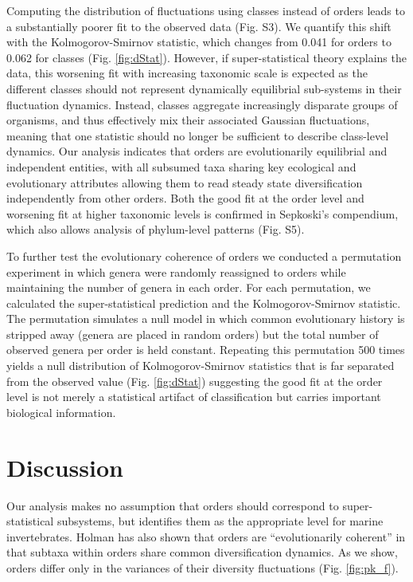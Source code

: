 \documentclass[12pt]{article}
\let\citep=\cite
\begin{document}
Computing the distribution of fluctuations using classes instead of
orders leads to a substantially poorer fit to the observed data
(Fig. S3). We quantify this shift with the
Kolmogorov-Smirnov statistic, which changes from 0.041 for orders to
0.062 for classes (Fig. \ref{fig:dStat}). However, if
super-statistical theory explains the data, this worsening fit with
increasing taxonomic scale is expected as the different classes should
not represent dynamically equilibrial sub-systems in their fluctuation
dynamics. Instead, classes aggregate increasingly disparate groups of
organisms, and thus effectively mix their associated Gaussian
fluctuations, meaning that one statistic should no longer be
sufficient to describe class-level dynamics. Our analysis indicates
that orders are evolutionarily equilibrial and independent entities,
with all subsumed taxa sharing key ecological and evolutionary
attributes allowing them to read steady state diversification
independently from other orders. Both the good fit at the order level
and worsening fit at higher taxonomic levels is confirmed in
Sepkoski's compendium, which also allows analysis of phylum-level
patterns (Fig. S5).

To further test the evolutionary coherence of orders we conducted a
permutation experiment in which genera were randomly reassigned to
orders while maintaining the number of genera in each order. For each
permutation, we calculated the super-statistical prediction and the
Kolmogorov-Smirnov statistic. The permutation simulates a null model
in which common evolutionary history is stripped away (genera are
placed in random orders) but the total number of observed genera per
order is held constant.  Repeating this permutation 500 times yields a
null distribution of Kolmogorov-Smirnov statistics that is far
separated from the observed value (Fig. \ref{fig:dStat}) suggesting
the good fit at the order level is not merely a statistical artifact
of classification but carries important biological information.

\section*{Discussion}

Our analysis makes no assumption that orders should correspond to
super-statistical subsystems, but identifies them as the appropriate
level for marine invertebrates. Holman \citep{holman1989} has also
shown that orders are ``evolutionarily coherent'' in that subtaxa
within orders share common diversification dynamics. As we show,
orders differ only in the variances of their diversity fluctuations
(Fig. \ref{fig:pk_f}).
\end{document}

